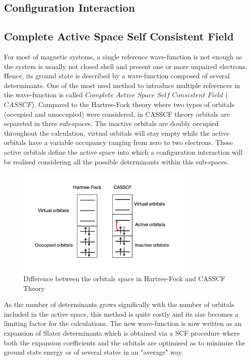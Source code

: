 \documentclass[12pt]{report}
\numberwithin{equation}{section}
\begin{document}
\subsection{Configuration Interaction}




\subsection{Complete Active Space Self Consistent Field}

For most of magnetic systems, a single reference wave-function is not enough as the system is usually not closed shell and present one or more unpaired electrons.
Hence, its ground state is described by a wave-function composed of several determinants.
One of the most used method to introduce multiple references in the wave-function is called $Complete$ $Active$ $Space$ $Self$ $Consistent$ $Field$ ($CASSCF$). 
Compared to the Hartree-Fock theory where two types of orbitals (occupied and unoccupied) were considered, in CASSCF theory orbitals are separeted in three sub-spaces. The inactive orbitals are doubly occupied throughout the calculation, virtual orbitals will stay empty while the active orbitals have a variable occupancy ranging from zero to two electrons.
These active orbitals define the active space into which a configuration interaction will be realised considering all the possible determinants within this sub-spaces. 
\begin{figure}
    \centering
    \includegraphics[width=0.8\textwidth]{Images/EspaceCAS.png}
    \caption{Difference between the orbitals space in Hartree-Fock and CASSCF Theory}
    \label{CAS}
\end{figure}
As the number of determinants grows significally with the number of orbitals included in the active space, this method is quite costly and its size becomes a limiting factor for the calculations.
The new wave-function is now written as an expansion of Slater determinants which is obtained via a SCF procedure where both the expansion coefficients and the orbitals are optimised as to minimize the ground state energy or of several states in an "average" way. 
\end{document}
